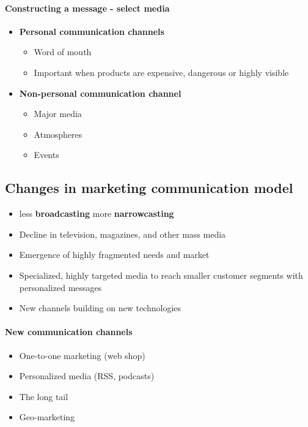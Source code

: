 \documentclass[a4paper,titlepage] {scrartcl}
\begin{document}
\paragraph{Constructing a message - select media} %
\label{par:constructing_a_message_select_media}
\begin{itemize}
	\item \textbf{Personal communication channels}
	\begin{itemize}
		\item Word of mouth
		\item Important when products are expensive, dangerous or highly visible
	\end{itemize}
	\item \textbf{Non-personal communication channel}
	\begin{itemize}
		\item Major media
		\item Atmospheres
		\item Events
	\end{itemize}
\end{itemize}

\subsection{Changes in marketing communication model}	
\begin{itemize}
	\item less \textbf{broadcasting} more \textbf{narrowcasting}
	\item Decline in television, magazines, and other mass media
	\item Emergence of highly fragmented needs and market
	\item Specialized, highly targeted media to reach smaller customer segments with personalized messages
	\item New channels building on new technologies
\end{itemize}

\paragraph{New communication channels} %
\label{par:new_communication_channels}
\begin{itemize}
	\item One-to-one marketing (web shop)
	\item Personalized media (RSS, podcasts)
	\item The long tail 
	\item Geo-marketing
\end{itemize}
\end{document}
